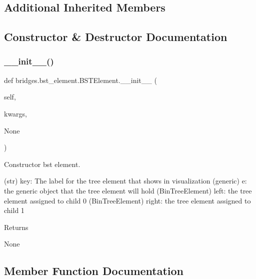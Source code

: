 \subsection*{Additional Inherited Members}


\subsection{Constructor \& Destructor Documentation}
\mbox{\label{classbridges_1_1bst__element_1_1_b_s_t_element_ab5f7e1266a3e1777472702f5a3f595c5}} 
\subsubsection{\texorpdfstring{\+\_\+\+\_\+init\+\_\+\+\_\+()}{\_\_init\_\_()}}
{\footnotesize\ttfamily def bridges.\+bst\+\_\+element.\+B\+S\+T\+Element.\+\_\+\+\_\+init\+\_\+\+\_\+ (\begin{DoxyParamCaption}\item[{}]{self,  }\item[{}]{kwargs,  }\item[{}]{None }\end{DoxyParamCaption})}



Constructor bst element. 

(str) key\+: The label for the tree element that shows in visualization (generic) e\+: the generic object that the tree element will hold (Bin\+Tree\+Element) left\+: the tree element assigned to child 0 (Bin\+Tree\+Element) right\+: the tree element assigned to child 1 \begin{DoxyReturn}{Returns}


None 
\end{DoxyReturn}


\subsection{Member Function Documentation}
\mbox{\label{classbridges_1_1bst__element_1_1_b_s_t_element_ad6763a7381b91e16d9dc927a6f501c81}} 
